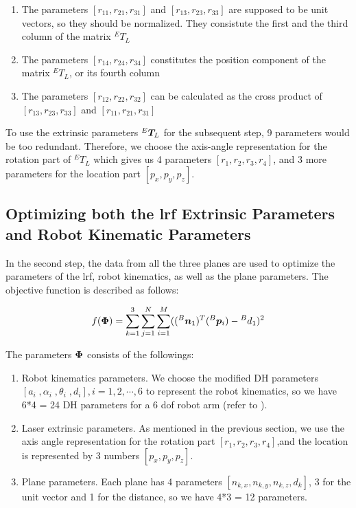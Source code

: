 \begin{enumerate}
\item The parameters $[r_{11}, r_{21}, r_{31}]$ and $[r_{13}, r_{23}, r_{33}]$ are supposed to be unit vectors, so they should be normalized. They consistute the first and the third column of the matrix ${^E}T_L$
\item The parameters $[r_{14}, r_{24}, r_{34}]$ constitutes the position component of the matrix ${^E}T_L$, or its fourth column
\item The parameters $[r_{12}, r_{22}, r_{32}]$ can be calculated as the cross product of  $[r_{13}, r_{23}, r_{33}]$ and $[r_{11}, r_{21}, r_{31}]$ 
\end{enumerate}

To use the extrinsic parameters ${^E}\vb*{T}_L$ for the subsequent step, 9 parameters would be too redundant. Therefore, we choose the axis-angle representation for the rotation part of ${^E}T_L$ which gives us 4 parameters $[r_1, r_2, r_3, r_4]$, and 3 more parameters for the location part $[p_x, p_y, p_z]$. 


\subsection{Optimizing both the \ac{lrf} Extrinsic Parameters and Robot Kinematic Parameters}
\label{sec:second_step}
In the second step, the data from all the three planes are used to optimize the parameters of the \ac{lrf}, robot kinematics, as well as the plane parameters. The objective function is described as follows:

\begin{equation}
 f (\vb*{\Phi}) =  \sum_{k=1}^{3} \sum_{j=1}^{N} \sum_{i=1}^{M} (({^B}\vb*{n}_1) ^T ({^B}\vb*{p}_i) - {^B}d_1)^2
\end{equation}

The parameters $\vb*{\Phi}$ consists of the followings:
\begin{enumerate}
\item Robot kinematics parameters. We choose the modified DH parameters \cite{Hayati1985} $[a_i \;, \alpha_i \;,\theta_i \;,d_i], i=1, 2, \cdots ,6$ to represent the robot kinematics, so we have 6*4 = 24 DH parameters for a 6 \ac{dof} robot arm (refer to ). 
\item Laser extrinsic parameters. As mentioned in the previous section, we use the axis angle representation for the rotation part $[r_1, r_2, r_3, r_4]$,and the location is represented by 3 numbers $[p_x, p_y, p_z]$. 
\item Plane parameters. Each plane has 4 parameters $[n_{k,x}, n_{k,y}, n_{k,z}, d_{k}]$, 3 for the unit vector and 1 for the distance, so we have 4*3 = 12 parameters. 
\end{enumerate}

